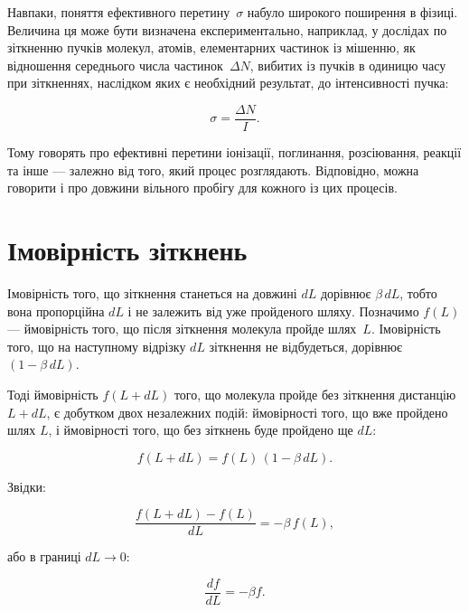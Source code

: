Навпаки, поняття ефективного перетину~$\sigma$ набуло широкого поширення в
фізиці. Величина ця може бути визначена експериментально, наприклад, у дослідах
по зіткненню пучків молекул, атомів, елементарних частинок із мішенню, як
відношення середнього числа частинок~$\Delta N$, вибитих із пучків в одиницю
часу при зіткненнях, наслідком яких є необхідний результат, до інтенсивності
пучка:

\begin{equation*}
	\sigma = \frac{\Delta N}{I}.
\end{equation*}

Тому говорять про ефективні перетини іонізації, поглинання, розсіювання,
реакції та інше --- залежно від того, який процес розглядають. Відповідно, можна
говорити і про довжини вільного пробігу для кожного із цих процесів.

\section{Імовірність зіткнень}

Імовірність того, що зіткнення станеться на довжині $dL$ дорівнює
$\beta\, dL$, тобто вона пропорційна $dL$ і не залежить від уже пройденого
шляху. Позначимо $f(L)$ — ймовірність того, що після зіткнення молекула пройде
шлях~$L$. Імовірність того, що на наступному відрізку $dL$ зіткнення не
відбудеться, дорівнює $(1 - \beta\, dL)$.

Тоді ймовірність $f(L + dL)$ того, що молекула пройде без зіткнення дистанцію
$L + dL$, є добутком двох незалежних подій:
ймовірності того, що вже пройдено шлях $L$, і ймовірності того, що без
зіткнень буде пройдено ще $dL$:

\begin{equation}
	f(L + dL) = f(L)\,(1 - \beta\, dL).
	\label{eq:152.1}
\end{equation}

Звідки:

\begin{equation}
	\frac{f(L + dL) - f(L)}{dL} = -\beta\, f(L),
	\label{eq:152.2}
\end{equation}

або в границі $dL \to 0$:

\begin{equation}
	\frac{df}{dL} = -\beta f.
	\label{eq:152.3}
\end{equation}

